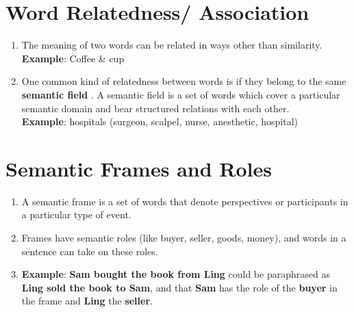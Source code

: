 \section{Word Relatedness/ Association \cite{nlp-1}}\label{Word Relatedness/ Association}
\begin{enumerate}
    \item The meaning of two words can be related in ways other than similarity.\\
    \textbf{Example}: Coffee \& cup

    \item One common kind of relatedness between words is if they belong to the same \textbf{semantic field} . A semantic field is a set of words which cover a particular semantic domain and bear structured relations with each other.\\
    \textbf{Example}: hospitals (surgeon, scalpel, nurse, anesthetic, hospital)

\end{enumerate}

\section{Semantic Frames and Roles \cite{nlp-1}} \label{Semantic Frames and Roles}
\begin{enumerate}
    \item A semantic frame is a set of words that denote perspectives or participants in a particular type of event.

    \item Frames have semantic roles (like buyer, seller, goods, money), and words in a sentence can take on these roles.

    \item \textbf{Example}: \textbf{Sam bought the book from Ling} could be paraphrased as \textbf{Ling sold the book to Sam}, and that \textbf{Sam} has the role of the \textbf{buyer} in the frame and \textbf{Ling} the \textbf{seller}.
\end{enumerate}

